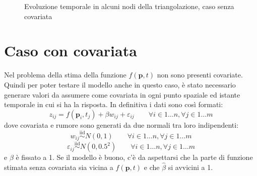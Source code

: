 \documentclass[a4paper,11pt,twoside,openright]{book}							%
\begin{document}
\begin{figure}[t]
	\centering
	\caption{Evoluzione temporale in alcuni nodi della triangolazione, caso senza covariata}
	\label{fig:DomC_ris2}
\end{figure}
\newpage
\section{Caso con covariata}

Nel problema della stima della funzione $f(\bm p,t)$ non sono presenti covariate. Quindi per poter testare il modello anche in questo caso, è stato necessario generare valori da assumere come covariata in ogni punto spaziale ed istante temporale in cui si ha la risposta.
In definitiva i dati sono così formati:
$$
z_{ij}=f(\bm p_{i},t_j) + \beta w_{ij} + \varepsilon_{ij} \qquad \forall i \in 1\ldots n, \forall j \in 1\ldots m
$$
dove covariata e rumore sono generati da due normali tra loro indipendenti:
$$
w_{ij}\stackrel{\mathrm{iid}}{\sim}N(0,1) \qquad \forall i \in 1\ldots n, \forall j \in 1\ldots m
$$
$$
\varepsilon_{ij}\stackrel{\mathrm{iid}}{\sim}N(0,0.5^2) \qquad \forall i \in 1\ldots n, \forall j \in 1\ldots m
$$
e $\beta$ è fissato a 1. Se il modello è buono, c'è da aspettarsi che la parte di funzione stimata senza covariata sia vicina a $f(\bm p,t)$ e che $\hat{\beta}$ si avvicini a 1.
 
\end{document}

